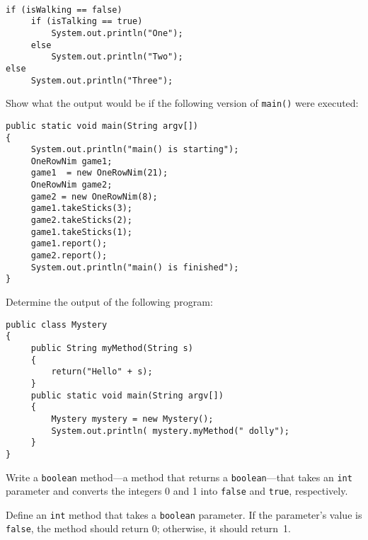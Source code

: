 \begin{EXRtwo}
\begin{EXRtwoLL}
\item \mbox{ }

\begin{jjjlisting}
\begin{lstlisting}
if (isWalking == false)
     if (isTalking == true)
         System.out.println("One");
     else
         System.out.println("Two");
else
     System.out.println("Three");
\end{lstlisting}
\end{jjjlisting}

\end{EXRtwoLL}

\item  Show what the output would be if the following version of
{\tt main()}  were executed:

\begin{jjjlisting}
\begin{lstlisting}
public static void main(String argv[])
{
     System.out.println("main() is starting");
     OneRowNim game1;
     game1  = new OneRowNim(21);
     OneRowNim game2;
     game2 = new OneRowNim(8);
     game1.takeSticks(3);
     game2.takeSticks(2);
     game1.takeSticks(1);
     game1.report();
     game2.report();
     System.out.println("main() is finished");
}
\end{lstlisting}
\end{jjjlisting}

\item  Determine the output of the following program:

\begin{jjjlisting}
\begin{lstlisting}
public class Mystery
{
     public String myMethod(String s)
     {
         return("Hello" + s);
     }
     public static void main(String argv[])
     {
         Mystery mystery = new Mystery();
         System.out.println( mystery.myMethod(" dolly");
     }
}
\end{lstlisting}
\end{jjjlisting}

\item  Write a {\tt boolean} method---a method that returns
a {\tt boolean}---that takes an {\tt int} parameter and converts the
integers 0 and 1 into {\tt false} and {\tt true}, respectively.

\item  Define an {\tt int} method that takes a {\tt boolean}
parameter.  If the parameter's value is {\tt false}, the method
should return 0; otherwise, it should return~1.


\end{EXRtwo}

